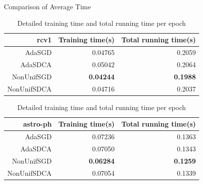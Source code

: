\begin{frame}{Comparison of Average Time}
\begin{table}[htbp]
    \centering
    \caption{Detailed training time and total running time per epoch}
    \label{table:rcv1_time}
    \begin{tabular}{|r|r|r|}
        \hline 
        rcv1 & Training time(s) & Total running time(s) \\
        \hline
        AdaSGD & 0.04765 & 0.2059 \\
        \hline
        AdaSDCA & 0.05042 & 0.2064 \\
        \hline
        NonUnifSGD & \textbf{0.04244} & \textbf{0.1988} \\
        \hline
        NonUnifSDCA  & 0.04716 & 0.2037 \\
	\hline
    \end{tabular}
    \label{table:astro-ph_time}
    \begin{tabular}{|r|r|r|}
        \hline 
        astro-ph &  Training time(s) & Total running time(s) \\
        \hline
        AdaSGD & 0.07236 & 0.1363 \\
        \hline
        AdaSDCA & 0.07050 & 0.1343 \\
        \hline
        NonUnifSGD & \textbf{0.06284} & \textbf{0.1259} \\
        \hline
        NonUnifSDCA  & 0.07054 & 0.1339 \\
        \hline
    \end{tabular}
\end{table}
\end{frame}

